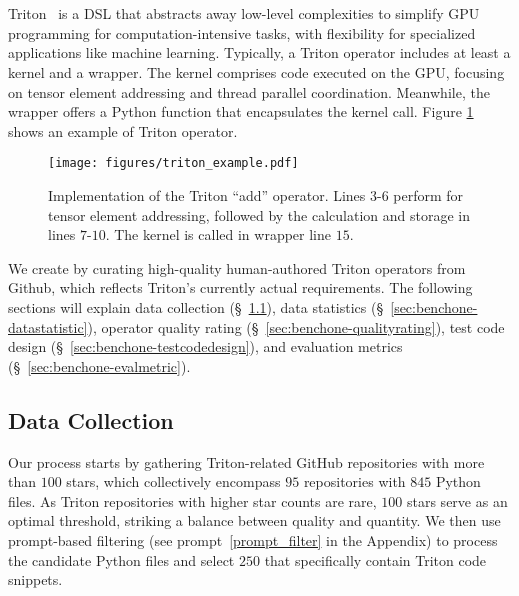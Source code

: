 \section{\benchone}
\label{sec:git}

Triton~\cite{tillet2019triton} is a DSL that abstracts away low-level complexities to simplify GPU programming for computation-intensive tasks, with flexibility for specialized applications like machine learning.
Typically, a Triton operator includes at least a kernel and a wrapper. 
The kernel comprises code executed on the GPU, focusing on tensor element addressing and thread parallel coordination. 
Meanwhile, the wrapper offers a Python function that encapsulates the kernel call.
Figure \ref{fig:triton_example} shows an example of Triton operator. 

\begin{figure}[ht]
    \centering
    \texttt{[image: figures/triton\_example.pdf]}
    \caption{
    Implementation of the Triton ``add'' operator. Lines $3$-$6$ perform for tensor element addressing, followed by the calculation and storage in lines $7$-$10$. 
    The kernel is called in wrapper line $15$.
    }
    \label{fig:triton_example}
    \vspace{-3mm}
\end{figure}

We create \benchone by curating high-quality human-authored Triton operators from Github, which reflects Triton’s currently actual requirements. 
The following sections will explain data collection (\S~\ref{sec:benchone-datacollect}), data statistics (\S~\ref{sec:benchone-datastatistic}), operator quality rating (\S~\ref{sec:benchone-qualityrating}), test code design (\S~\ref{sec:benchone-testcodedesign}), and evaluation metrics (\S~\ref{sec:benchone-evalmetric}).



\subsection{Data Collection}
\label{sec:benchone-datacollect}
Our process starts by gathering Triton-related GitHub repositories with more than $100$ stars, which collectively encompass $95$ repositories with $845$ Python files. 
As Triton repositories with higher star counts are rare, $100$ stars serve as an optimal threshold, striking a balance between quality and quantity.
We then use prompt-based filtering (see prompt~\ref{prompt_filter} in the Appendix) to process the candidate Python files and select $250$ that specifically contain Triton code snippets.



